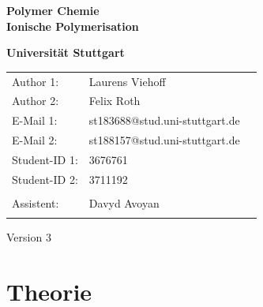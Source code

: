 \documentclass[10pt,a4paper,ngerman]{scrartcl}
\begin{document}
\begin{titlepage}
	\vspace*{2,5cm}
	\begin{center}
		\begin{LARGE}
			\textbf{Polymer Chemie}\\
			\textbf{Ionische Polymerisation}\\
		\end{LARGE}
		\vspace{1cm}
		\textbf{Universität Stuttgart}\\
		\vspace*{1,5cm}
		\begin{tabular}{lp{}l}
			Author 1:     &Laurens Viehoff\\
            Author 2:     &Felix Roth\\   
			E-Mail 1:      &st183688@stud.uni-stuttgart.de\\
            E-Mail 2:      &st188157@stud.uni-stuttgart.de  \\
			Student-ID 1: & 3676761   \\ 
            Student-ID 2: & 3711192 \\ \\
			Assistent:  &  Davyd Avoyan \\ \\ 
		\end{tabular}
		
		\vspace{2cm}
		Version 3\\
	\end{center}

    
\end{titlepage}
\thispagestyle{empty}
\renewcommand{\thepage}{\arabic{page}}
\newpage
\tableofcontents
\setcounter{page}{1}
\renewcommand{\thepage}{\arabic{page}}
\newpage

 
\section{Theorie}
\end{document}
